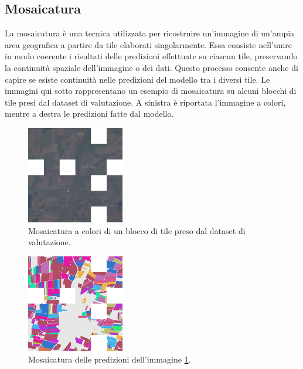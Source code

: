 \newpage
\subsection{Mosaicatura}
La mosaicatura è una tecnica utilizzata per ricostruire un'immagine di 
un'ampia area geografica a partire da tile elaborati singolarmente.
Essa consiste nell'unire in modo coerente i risultati delle predizioni effettuate su 
ciascun tile, preservando la continuità spaziale dell'immagine o dei dati.
Questo processo consente anche di capire se esiste continuità nelle 
predizioni del modello tra i diversi tile.
Le immagini qui sotto rappresentano un esempio di mosaicatura su alcuni blocchi 
di tile presi dal dataset di valutazione. A sinistra è riportata l'immagine a colori, mentre a 
destra le predizioni fatte dal modello.

\begin{multicols}{2}
{
    \begin{figure}[H]
        \centering
        \includegraphics[width=0.38\textwidth]{Immagini/sperimentazione/MOSAICATURA_1_RGB.png}
        \caption{Mosaicatura a colori di un blocco di tile preso dal dataset di valutazione.}
        \label{fig:MOSAIC_RGB_1}
    \end{figure}
}
{
    \begin{figure}[H]
        \centering
        \includegraphics[width=0.38\textwidth]{Immagini/sperimentazione/MOSAICATURA_1_MASK.png}
        \caption{Mosaicatura delle predizioni dell'immagine \ref{fig:MOSAIC_RGB_1}.}
    \end{figure}
}
\end{multicols}

